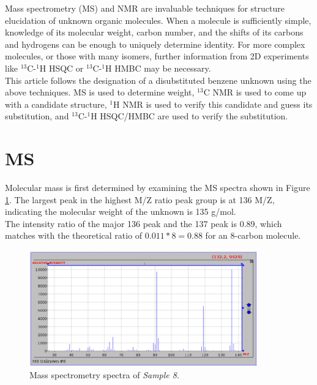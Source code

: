 \documentclass[8.5pt,twoside,twocolumn]{article}
\begin{document}

Mass spectrometry (MS) and NMR are invaluable techniques for structure elucidation of unknown organic molecules. When a molecule is sufficiently simple, knowledge of its molecular weight, carbon number, and the shifts of its carbons and hydrogens can be enough to uniquely determine identity. For more complex molecules, or those with many isomers, further information from 2D experiments like $^{13}$C-$^{1}$H HSQC or $^{13}$C-$^{1}$H HMBC may be necessary.\\

This article follows the designation of a disubstituted benzene unknown using the above techniques. MS is used to determine weight, $^{13}$C NMR is used to come up with a candidate structure, $^{1}$H NMR is used to verify this candidate and guess its substitution, and $^{13}$C-$^{1}$H HSQC/HMBC are used to verify the substitution.\\

\section{MS}
Molecular mass is first determined by examining the MS spectra shown in Figure \ref{fig:MS}. The largest peak in the highest M/Z ratio peak group is at 136 M/Z, indicating the molecular weight of the unknown is 135 g/mol.\\

The intensity ratio of the major 136 peak and the 137 peak is 0.89, which matches with the theoretical ratio of $0.011*8 = 0.88$ for an 8-carbon molecule.\\

\begin{figure}[h]
\centering
  \includegraphics[height=5cm]{figures/MS.png}
  \caption{Mass spectrometry spectra of \textit{Sample 8}.}
  \label{fig:MS}
\end{figure}
\end{document}
